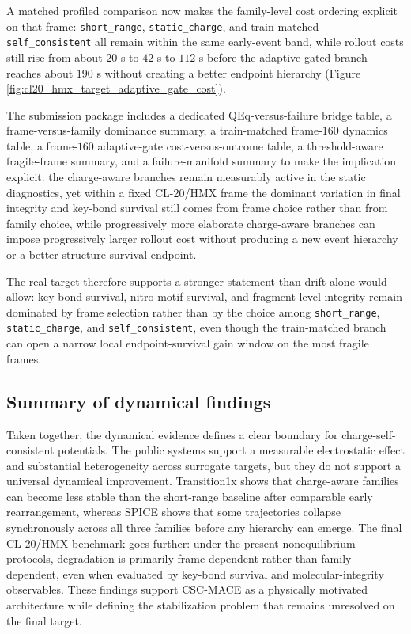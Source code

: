 A matched profiled comparison now makes the family-level cost ordering explicit on that frame: \texttt{short\_range}, \texttt{static\_charge}, and train-matched \texttt{self\_consistent} all remain within the same early-event band, while rollout costs still rise from about $20$ s to $42$ s to $112$ s before the adaptive-gated branch reaches about $190$ s without creating a better endpoint hierarchy (Figure \ref{fig:cl20_hmx_target_adaptive_gate_cost}).

The submission package includes a dedicated QEq-versus-failure bridge table, a frame-versus-family dominance summary, a train-matched frame-$160$ dynamics table, a frame-$160$ adaptive-gate cost-versus-outcome table, a threshold-aware fragile-frame summary, and a failure-manifold summary to make the implication explicit: the charge-aware branches remain measurably active in the static diagnostics, yet within a fixed CL-20/HMX frame the dominant variation in final integrity and key-bond survival still comes from frame choice rather than from family choice, while progressively more elaborate charge-aware branches can impose progressively larger rollout cost without producing a new event hierarchy or a better structure-survival endpoint.

The real target therefore supports a stronger statement than drift alone would allow: key-bond survival, nitro-motif survival, and fragment-level integrity remain dominated by frame selection rather than by the choice among \texttt{short\_range}, \texttt{static\_charge}, and \texttt{self\_consistent}, even though the train-matched branch can open a narrow local endpoint-survival gain window on the most fragile frames.

\subsection{Summary of dynamical findings}
Taken together, the dynamical evidence defines a clear boundary for charge-self-consistent potentials. The public systems support a measurable electrostatic effect and substantial heterogeneity across surrogate targets, but they do not support a universal dynamical improvement. Transition1x shows that charge-aware families can become less stable than the short-range baseline after comparable early rearrangement, whereas SPICE shows that some trajectories collapse synchronously across all three families before any hierarchy can emerge. The final CL-20/HMX benchmark goes further: under the present nonequilibrium protocols, degradation is primarily frame-dependent rather than family-dependent, even when evaluated by key-bond survival and molecular-integrity observables. These findings support CSC-MACE as a physically motivated architecture while defining the stabilization problem that remains unresolved on the final target.

